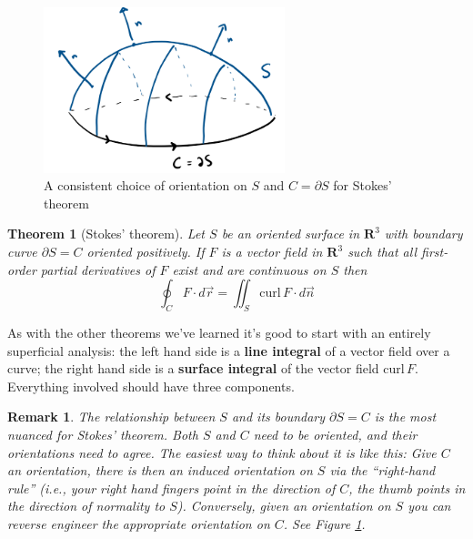 \documentclass[12pt]{article}
\numberwithin{equation}{subsection}
\numberwithin{figure}{subsection}
\newtheorem{thm}[subsection]{Theorem}
\theoremstyle{note}
\newtheorem{remark}[subsection]{Remark}
\newcommand{\curl}{\mathrm{curl\,}}
\begin{document}
{\begin{figure}[h!]
\centering
\includegraphics[width=70mm]{Images/surface-stokes}
\caption{A consistent choice of orientation on $S$ and $C=\partial S$ for Stokes' theorem}
\label{fig-stokes-thm}
\end{figure}

\begin{thm}[Stokes' theorem] \label{thm-stokes} Let $S$ be an oriented surface in $\mathbf{R}^3$ with boundary curve $\partial S = C$ oriented positively. If $F$ is a vector field in $\mathbf{R}^3$ such that all first-order partial derivatives of $F$ exist and are continuous on $S$ then
\begin{equation}
	\oint_C F\cdot d\vec{r}= \iint_{S} \curl F \cdot d\vec{n}
\end{equation}
\end{thm}

As with the other theorems we've learned it's good to start with an entirely superficial analysis: the left hand side is a \textbf{line integral} of a vector field over a curve; the right hand side is a \textbf{surface integral} of the vector field $\curl F$. Everything involved should have three components. 


\begin{remark} The relationship between $S$ and its boundary $\partial S=C$ is the most nuanced for Stokes' theorem. Both $S$ and $C$ need to be oriented, and their orientations need to agree. The easiest way to think about it is like this: Give $C$ an orientation, there is then an induced orientation on $S$ via the ``right-hand rule'' (i.e., your right hand fingers point in the direction of $C$, the thumb points in the direction of normality to $S$). Conversely, given an orientation on $S$ you can reverse engineer the appropriate orientation on $C$. See Figure \ref{fig-stokes-thm}.


\end{remark}




}
\end{document}
